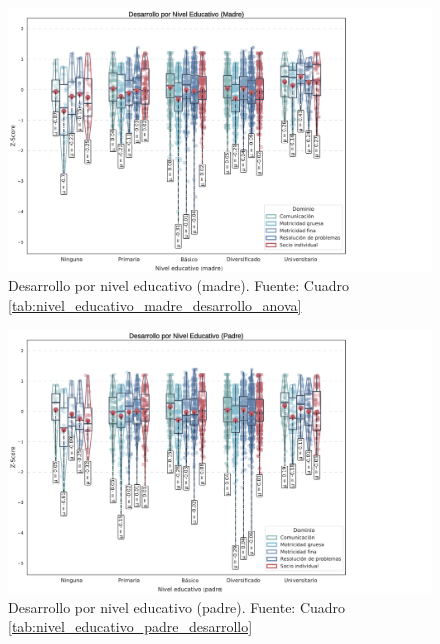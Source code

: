 \documentclass[11pt,letterpaper]{report}
\begin{document}
\begin{figure}[htbp]
    \centering
    \includegraphics[width=1\textwidth]{violinplot_nivel_educativo_madre}
	\captionsetup{font=footnotesize}
	\caption{Desarrollo por nivel educativo (madre). Fuente: Cuadro \ref{tab:nivel_educativo_madre_desarrollo_anova}}
    \label{fig:nivel_educativo_anova_madre}
\end{figure}

\begin{figure}[htbp]
    \centering
    \includegraphics[width=1\textwidth]{violinplot_nivel_educativo_padre}
	\captionsetup{font=footnotesize}
	\caption{Desarrollo por nivel educativo (padre). Fuente: Cuadro \ref{tab:nivel_educativo_padre_desarrollo}}
    \label{fig:nivel_educativo_anova_padre}
\end{figure}
\end{document}
